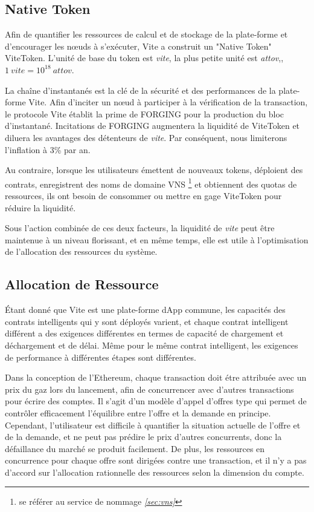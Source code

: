 \documentclass[UTF8,nofonts]{article}
\begin{document}
\begin{multicols}{2}
\subsection{Native Token}
Afin de quantifier les ressources de calcul et de stockage de la plate-forme et d'encourager les nœuds à s'exécuter, Vite a construit un "Native Token" ViteToken. L'unité de base du token est \textit{vite}, la plus petite unité est \textit{attov},,$1 \: vite = 10^{18} \: attov$.

La chaîne d'instantanés est la clé de la sécurité et des performances de la plate-forme Vite. Afin d'inciter un nœud à participer à la vérification de la transaction, le protocole Vite établit la prime de FORGING pour la production du bloc d'instantané. Incitations de FORGING augmentera la liquidité de ViteToken et diluera les avantages des détenteurs de \textit{vite}. Par conséquent, nous limiterons l'inflation à 3\% par an.

Au contraire, lorsque les utilisateurs émettent de nouveaux tokens, déploient des contrats, enregistrent des noms de domaine VNS \footnote{se référer au service de nommage \textit{\ref{sec:vns}}} et obtiennent des quotas de ressources, ils ont besoin de consommer ou mettre en gage ViteToken pour réduire la liquidité.

Sous l'action combinée de ces deux facteurs, la liquidité de \textit{vite} peut être maintenue à un niveau florissant, et en même temps, elle est utile à l'optimisation de l'allocation des ressources du système.

\subsection{Allocation de Ressource}
Étant donné que Vite est une plate-forme dApp commune, les capacités des contrats intelligents qui y sont déployés varient, et chaque contrat intelligent différent a des exigences différentes en termes de capacité de chargement et déchargement et de délai. Même pour le même contrat intelligent, les exigences de performance à différentes étapes sont différentes.

Dans la conception de l'Ethereum, chaque transaction doit étre attribuée avec un prix du gaz lors du lancement,  afin de concurrencer avec d'autres transactions pour écrire des comptes. Il s'agit d'un modèle d'appel d'offres type qui permet de contrôler efficacement l'équilibre entre l'offre et la demande en principe. Cependant, l'utilisateur est difficile à quantifier la situation actuelle de l'offre et de la demande, et ne peut pas prédire le prix d'autres concurrents, donc la défaillance du marché se produit facilement. De plus, les ressources en concurrence pour chaque offre sont dirigées contre une transaction, et il n'y a pas d'accord sur l'allocation rationnelle des ressources selon la dimension du compte.



\end{multicols}
\end{document}
